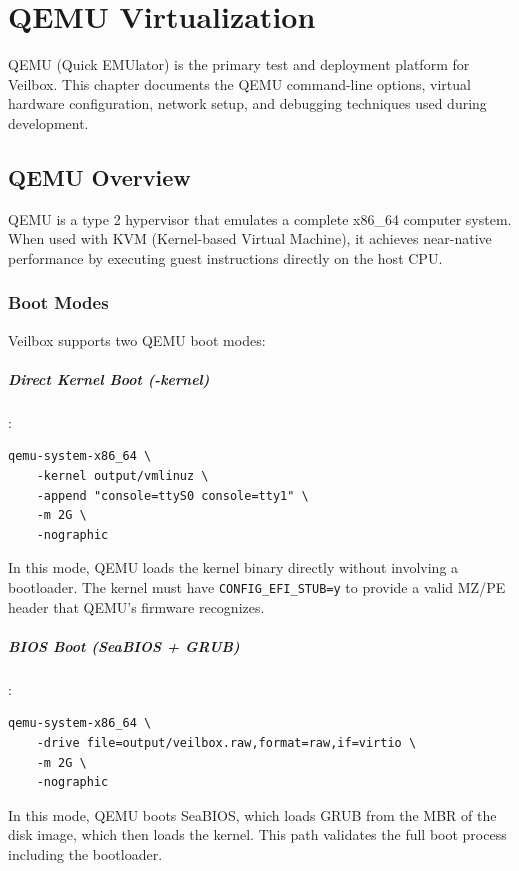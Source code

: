 \chapter{QEMU Virtualization}
\label{ch:qemu}

QEMU (Quick EMUlator) is the primary test and deployment platform for
Veilbox. This chapter documents the QEMU command-line options, virtual
hardware configuration, network setup, and debugging techniques used
during development.

\section{QEMU Overview}

QEMU is a type 2 hypervisor that emulates a complete x86\_64 computer
system. When used with KVM (Kernel-based Virtual Machine), it achieves
near-native performance by executing guest instructions directly on the
host CPU.

\subsection{Boot Modes}

Veilbox supports two QEMU boot modes:

\paragraph{Direct Kernel Boot (-kernel)}:
\begin{lstlisting}
qemu-system-x86_64 \
    -kernel output/vmlinuz \
    -append "console=ttyS0 console=tty1" \
    -m 2G \
    -nographic
\end{lstlisting}

In this mode, QEMU loads the kernel binary directly without involving
a bootloader. The kernel must have \texttt{CONFIG\_EFI\_STUB=y} to
provide a valid MZ/PE header that QEMU's firmware recognizes.

\paragraph{BIOS Boot (SeaBIOS + GRUB)}:
\begin{lstlisting}
qemu-system-x86_64 \
    -drive file=output/veilbox.raw,format=raw,if=virtio \
    -m 2G \
    -nographic
\end{lstlisting}

In this mode, QEMU boots SeaBIOS, which loads GRUB from the MBR of the
disk image, which then loads the kernel. This path validates the full
boot process including the bootloader.

